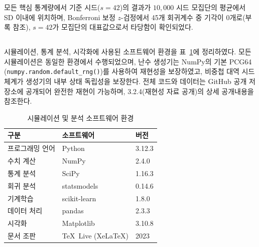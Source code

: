 모든 핵심 통계량에서 기준 시드($s = 42$)의 결과가 $10{,}000$ 시드 모집단의
평균에서 \,SD 이내에 위치하며, Bonferroni 보정 $z$-검정에서
45개 회귀계수 중 기각이 0개로(부록 참조), $s = 42$가
모집단의 대표값으로서 타당함이 확인되었다.


\subsection{}
\label{subsec:software}

시뮬레이션, 통계 분석, 시각화에 사용된 소프트웨어 환경을
\p{[}표~\ref{tab:software-env}\p{]}에 정리하였다. 모든 시뮬레이션은 동일한
환경에서 수행되었으며, 난수 생성기는 NumPy의 기본 PCG64
(\texttt{numpy.random.default\_rng()})를 사용하여 재현성을 보장하였고,
비중첩 대역 시드 체계가 생성기의 내부 상태 독립성을 보장한다.
전체 코드와 데이터는 GitHub 공개 저장소에
공개되어 완전한 재현이 가능하며, 3.2.4(재현성 자료 공개)의 상세 공개내용을 참조한다.

\begin{table}[htbp]
\centering
\caption{시뮬레이션 및 분석 소프트웨어 환경}
\label{tab:software-env}
\begin{tabular}{lll}
\toprule
\textbf{구분} & \textbf{소프트웨어} & \textbf{버전} \\
\midrule
프로그래밍 언어 & Python          & 3.12.3 \\
수치 계산       & NumPy           & 2.4.0 \\
통계 분석       & SciPy           & 1.16.3 \\
회귀 분석       & statsmodels     & 0.14.6 \\
기계학습        & scikit-learn    & 1.8.0 \\
데이터 처리     & pandas          & 2.3.3 \\
시각화          & Matplotlib      & 3.10.8 \\
문서 조판       & \TeX\ Live (Xe\LaTeX) & 2023 \\
\bottomrule
\end{tabular}
\end{table}


\subsection{}
\label{subsec:golden_compare}

